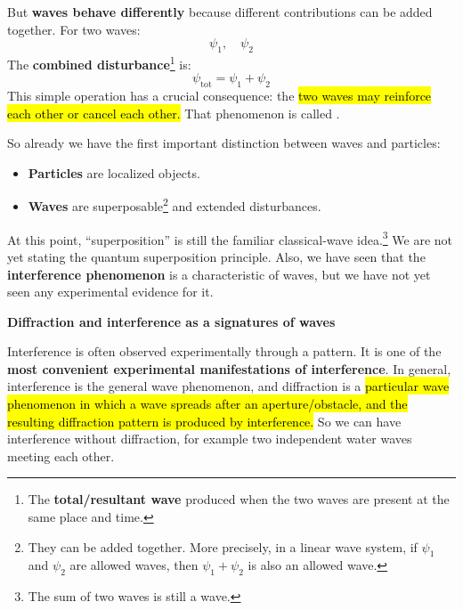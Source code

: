 \highspace
But \textbf{waves behave differently} because different contributions can be added together. For two waves:
\begin{equation*}
    \psi_1, \quad \psi_2
\end{equation*}
The \textbf{combined disturbance}\footnote{%
    The \textbf{total/resultant wave} produced when the two waves are present at the same place and time.
} is:
\begin{equation*}
    \psi_{\text{tot}} = \psi_1 + \psi_2
\end{equation*}
This simple operation has a crucial consequence: the \hl{two waves may reinforce each other or cancel each other.} That phenomenon is called .

\newpage

\noindent
So already we have the first important distinction between waves and particles:
\begin{itemize}
    \item \textbf{Particles} are localized objects.
    \item \textbf{Waves} are superposable\footnote{%
            They can be added together. More precisely, in a linear wave system, if $\psi_1$ and $\psi_2$ are allowed waves, then $\psi_1 + \psi_2$ is also an allowed wave.
        } and extended disturbances.
\end{itemize}
At this point, ``superposition'' is still the familiar classical-wave idea.\footnote{%
    The sum of two waves is still a wave.
} We are not yet stating the quantum superposition principle. Also, we have seen that the \textbf{interference phenomenon} is a characteristic of waves, but we have not yet seen any experimental evidence for it.

\highspace
\begin{flushleft}
    \textcolor{Green3}{ \textbf{Diffraction and interference as a signatures of waves}}
\end{flushleft}
Interference is often observed experimentally through a  pattern. It is one of the \textbf{most convenient experimental manifestations of interference}. In general, interference is the general wave phenomenon, and diffraction is a \hl{particular wave phenomenon in which a wave spreads after an aperture/obstacle, and the resulting diffraction pattern is produced by interference.} So we can have interference without diffraction, for example two independent water waves meeting each other.

